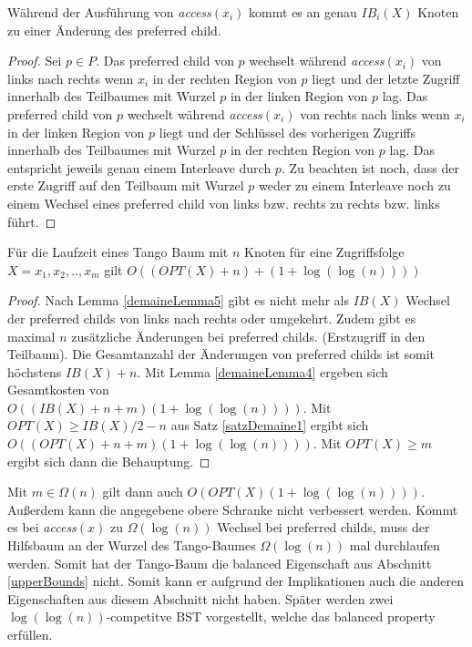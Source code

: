 \documentclass[a4paper,12pt]{article}
\begin{document}
\begin{Lemma} \label{demaineLemma5}
	Während der Ausführung von \textit{access}$\left(x_i\right)$ kommt es an genau $\mathit{IB}_i\left(X\right)$ Knoten zu einer Änderung des preferred child.
\end{Lemma}
\begin{proof}
	Sei $p \in P$. Das preferred child von $p$ wechselt während  \textit{access}$\left(x_i\right)$ von links nach rechts  wenn $x_i$ in der rechten Region von $p$ liegt und der letzte Zugriff innerhalb des Teilbaumes mit Wurzel $p$ in der linken Region von $p$ lag.  Das preferred child von $p$ wechselt während  \textit{access}$\left(x_i\right)$ von rechts nach links  wenn $x_i$ in der linken Region von $p$ liegt und der Schlüssel des vorherigen Zugriffs innerhalb des Teilbaumes mit Wurzel $p$ in der rechten Region von $p$ lag. Das entspricht jeweils genau einem Interleave durch $p$. Zu beachten ist noch, dass der erste Zugriff auf den Teilbaum mit Wurzel $p$ weder zu einem Interleave noch zu einem Wechsel eines preferred child von links bzw. rechts zu rechts bzw. links führt. 	
\end{proof}

\begin{Satz} \label{demaineSatz2}
	Für die Laufzeit eines Tango Baum mit $n$ Knoten für eine Zugriffsfolge $X = x_1, x_2,.., x_m$ gilt $O\left(\left(\mathit{OPT}\left(X\right) + n\right)  + \left(  1 + \log\left(\log \left(n\right)\right)\right)   \right)$
\end{Satz}
\begin{proof}
	Nach Lemma \ref{demaineLemma5} gibt es nicht mehr als  $\mathit{IB}\left(X\right)$ Wechsel der preferred childs von links nach rechts oder umgekehrt. Zudem gibt es maximal $n$ zusätzliche Änderungen bei preferred childs. (Erstzugriff in den Teilbaum). Die Gesamtanzahl der Änderungen von preferred childs ist somit höchstens $\mathit{IB}\left(X\right) + n$. Mit Lemma \ref{demaineLemma4} ergeben sich Gesamtkosten von\\ $O\left(\left(\mathit{IB}\left(X\right) + n +m \right) \left( 1 + \log \left(\log\left(n\right)\right)\right) \right)$. Mit $\mathit{OPT}\left(X\right) \geq \mathit{IB}\left(X\right) /2 -n $ aus Satz \ref{satzDemaine1} ergibt sich 
	$O\left(\left(\mathit{OPT}\left(X\right) + n +m \right) \left( 1 + \log \left(\log\left(n\right)\right)\right) \right)$. Mit $\mathit{OPT}\left(X\right) \geq m$ ergibt sich dann die Behauptung.
\end{proof}
\noindent Mit $m \in \Omega\left(n\right)$ gilt dann auch 
$O\left(	\mathit{OPT}\left(X\right) 	\left( 1 + \log \left(\log \left(n\right)\right)\right)	 \right)$.
Außerdem kann die angegebene obere Schranke nicht verbessert werden. Kommt es bei \textit{access}$\left(x\right)$ zu $\Omega\left(\log\left(n\right)\right)$ Wechsel bei preferred childs, muss der Hilfsbaum an der Wurzel des Tango-Baumes $\Omega\left(\log\left(n\right)\right)$ mal durchlaufen werden. Somit hat der Tango-Baum die balanced Eigenschaft aus Abschnitt \ref{upperBounds} nicht. Somit kann er aufgrund der Implikationen auch die anderen Eigenschaften aus diesem Abschnitt nicht haben. Später werden zwei $\log\left(\log\left(n\right)\right)$-competitve BST vorgestellt, welche das balanced property erfüllen.      
\end{document}
